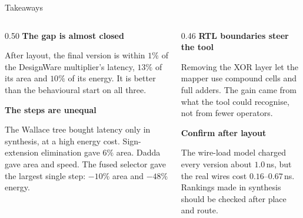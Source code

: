 \documentclass[aspectratio=169,11pt]{beamer}
\begin{document}
\begin{frame}{Takeaways}

\begin{columns}[T]
\begin{column}{0.50\textwidth}
\small
\textbf{The gap is almost closed}\par
After layout, the final version is within $1\%$ of the DesignWare
multiplier's latency, $13\%$ of its area and $10\%$ of its energy. It is
better than the behavioural start on all three.

\vspace{8pt}
\textbf{The steps are unequal}\par
The Wallace tree bought latency only in synthesis, at a high energy cost.
Sign-extension elimination gave $6\%$ area. Dadda gave area and speed. The
fused selector gave the largest single step: $-10\%$ area and $-48\%$ energy.
\end{column}

\begin{column}{0.46\textwidth}
\small
\textbf{RTL boundaries steer the tool}\par
Removing the XOR layer let the mapper use compound cells and full adders. The
gain came from what the tool could recognise, not from fewer operators.

\vspace{8pt}
\textbf{Confirm after layout}\par
The wire-load model charged every version about $1.0$\,ns, but the real wires
cost $0.16$--$0.67$\,ns. Rankings made in synthesis should be checked after
place and route.
\end{column}
\end{columns}

\end{frame}
\end{document}
